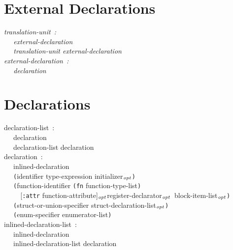 \documentclass[a4]{article}
\def\|{\verb|} %|
\newcommand{\opt}{$_{{\it opt}}$}
\begin{document}
\small
\section{External Declarations}
\it \noindent
translation-unit{\rm \ :}\\
\|  | external-declaration \\
\|  | translation-unit external-declaration \\


\noindent
external-declaration{\rm \ :} \\
\|  | declaration \\
\rm 
\section{Declarations}
\it 

\noindent
declaration-list{\rm \ :} \\
\|  | declaration \\
\|  | declaration-list declaration \\ 

\noindent
declaration{\rm \ :} \\
\|  | inlined-declaration \\
\|  | {\tt (}identifier type-expression initializer\opt{\tt )} \\
\|  | {\tt (}function-identifier {\tt (fn} function-type-list{\tt )}\\
\|    | {\rm [}{\tt :attr} function-attribute{\rm ]}\opt register-declarator\opt\ block-item-list\opt{\tt )} \\ 
\|  | {\tt (}struct-or-union-specifier struct-declaration-list\opt{\tt )} \\
\|  | {\tt (}enum-specifier enumerator-list{\tt )} \\

\noindent
inlined-declaration-list{\rm \ :} \\
\|  | inlined-declaration \\
\|  | inlined-declaration-list declaration \\ 
\end{document}
